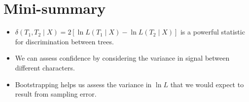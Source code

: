 \myNewSlide
\section*{Mini-summary}

\begin{itemize}
    \item $\delta(T_1,T_2 \mid X) = 2\left[\ln L(T_1 \mid X) - \ln L(T_2 \mid X)\right]$ is a powerful statistic for discrimination between trees.
    \item We can assess confidence by considering the variance in signal between different characters.
    \item Bootstrapping helps us assess the variance in $\ln L$ that we would expect to result from sampling error.
\end{itemize}


